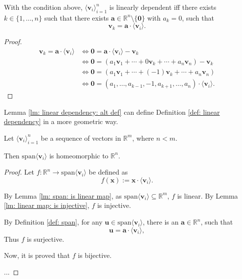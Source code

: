 \begin{lemma}
	\label{lm: linear dependency: alt def}
	With the condition above, $\langle\mathbf v_i\rangle_{i = 1}^n$ is linearly dependent iff there exists $k \in \{1, \ldots, n\}$ such that there exists $\mathbf a \in \mathbb R^n \setminus \{\mathbf 0\}$ with $a_k = 0$, such that
	$$
	\mathbf v_k = \mathbf a \cdot \langle \mathbf v_i \rangle.
	$$
	
	\begin{proof}
		$$
		\begin{aligned}
			\mathbf v_k = \mathbf a \cdot \langle \mathbf v_i \rangle &\iff \mathbf 0 = \mathbf a \cdot \langle \mathbf v_i \rangle - \mathbf v_k \\
			&\iff \mathbf 0 = (a_1 \mathbf v_1 + \cdots + 0 \mathbf v_k + \cdots + a_n \mathbf v_n) - \mathbf v_k \\
			&\iff \mathbf 0 = (a_1 \mathbf v_1 + \cdots + (-1) \mathbf v_k + \cdots + a_n \mathbf v_n) \\
			&\iff \mathbf 0 = (a_1, \ldots, a_{k - 1}, -1, a_{k + 1}, \ldots, a_n) \cdot \langle \mathbf v_i \rangle.
		\end{aligned}
		$$
	\end{proof}
\end{lemma}


\begin{note}
	Lemma \ref{lm: linear dependency: alt def} can define Definition \ref{def: linear dependency} in a more geometric way.
\end{note}


\begin{lemma}
	Let $\langle \mathbf v_i \rangle_{i = 1}^n$ be a sequence of vectors in $\mathbb R^m$, where $n < m$.
	
	Then $\mathrm{span}\langle \mathbf v_i \rangle$ is homeomorphic to $\mathbb R^n$.
	
	\begin{proof}
		Let $f: \mathbb R^n \to \mathrm{span}\langle \mathbf v_i \rangle$ be defined as
		$$
		f(\mathbf x) := \mathbf x \cdot \langle \mathbf v_i \rangle.
		$$
		
		By Lemma \ref{lm: span: is linear map}, as $\mathrm{span}\langle \mathbf v_i \rangle \subseteq \mathbb R^m$, $f$ is linear. By Lemma \ref{lm: linear map: is injective}, $f$ is injective.
		
		By Definition \ref{def: span}, for any $\mathbf u \in \mathrm{span} \langle \mathbf v_i \rangle$, there is an $\mathbf a \in \mathbb R^n$, such that
		$$
		\mathbf u = \mathbf a \cdot \langle \mathbf v_i \rangle,
		$$
		Thus $f$ is surjective.
		
		Now, it is proved that $f$ is bijective.
		
		...
	\end{proof}
\end{lemma}


